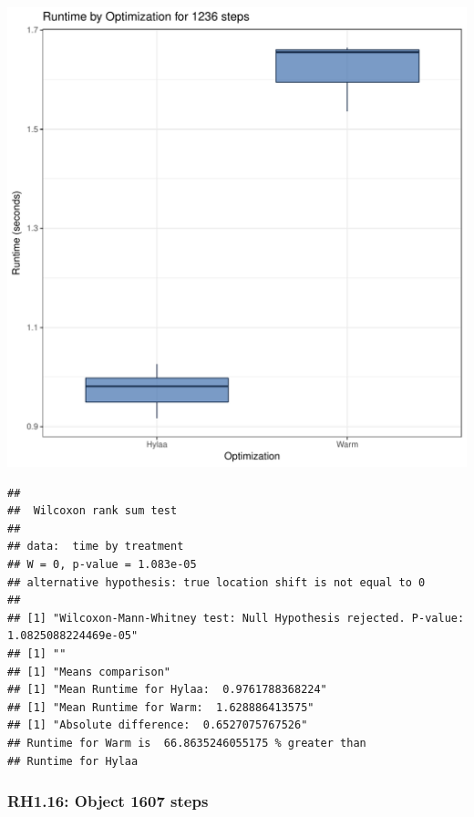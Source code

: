 \documentclass{article}\usepackage[]{graphicx}\usepackage[]{color}
\makeatletter
\def\maxwidth{ %
  \ifdim\Gin@nat@width>\linewidth
    \linewidth
  \else
    \Gin@nat@width
  \fi
}
\newenvironment{kframe}{%
 \def\at@end@of@kframe{}%
 \ifinner\ifhmode%
  \def\at@end@of@kframe{\end{minipage}}%
  \begin{minipage}{\columnwidth}%
 \fi\fi%
 \def\FrameCommand##1{\hskip\@totalleftmargin \hskip-\fboxsep
 \colorbox{shadecolor}{##1}\hskip-\fboxsep
     \hskip-\linewidth \hskip-\@totalleftmargin \hskip\columnwidth}%
 \MakeFramed {\advance\hsize-\width
   \@totalleftmargin\z@ \linewidth\hsize
   \@setminipage}}%
 {\par\unskip\endMakeFramed%
 \at@end@of@kframe}
\newenvironment{knitrout}{}{} %
\makeatother
\begin{document}
\begin{knitrout}
\color{fgcolor}
\includegraphics[width=\maxwidth]{figure/RH1_steps1236-1} 
\begin{kframe}\begin{verbatim}
## 
## 	Wilcoxon rank sum test
## 
## data:  time by treatment
## W = 0, p-value = 1.083e-05
## alternative hypothesis: true location shift is not equal to 0
## 
## [1] "Wilcoxon-Mann-Whitney test: Null Hypothesis rejected. P-value: 1.0825088224469e-05"
## [1] ""
## [1] "Means comparison"
## [1] "Mean Runtime for Hylaa:  0.9761788368224"
## [1] "Mean Runtime for Warm:  1.628886413575"
## [1] "Absolute difference:  0.6527075767526"
## Runtime for Warm is  66.8635246055175 % greater than 
## Runtime for Hylaa
\end{verbatim}
\end{kframe}
\end{knitrout}


\subsubsection{RH1.16: Object 1607 steps}
\end{document}
